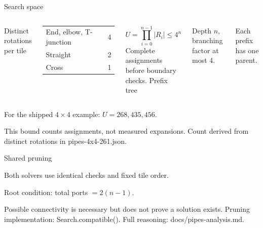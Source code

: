 \documentclass[aspectratio=169,11pt]{beamer}
\newcommand{\src}[1]{\vfill{\tiny\color{muted}#1}}
\begin{document}
\begin{frame}{Search space}
\begin{columns}[T,onlytextwidth]
\small Distinct rotations per tile\par\vspace{3mm}
\begin{tabular}{@{}lr@{}}\toprule
End, elbow, T-junction & 4\\
Straight & 2\\
Cross & 1\\\bottomrule
\end{tabular}
\vspace{4mm}
\normalsize
\[U=\prod_{i=0}^{n-1}|R_i|\leq 4^n\]
\small Complete assignments before boundary checks.
\small Prefix tree\par\vspace{3mm}
\par\small Depth $n$, branching factor at most 4.\par
Each prefix has one parent.
\end{columns}
\vspace{4mm}
For the shipped 4\,$\times$\,4 example: $U=268{,}435{,}456$.\par
\small This bound counts assignments, not measured expansions.
\src{Count derived from distinct rotations in pipes-4x4-261.json.}
\end{frame}

\begin{frame}{Shared pruning}
\centering
{}
\vspace{3mm}\par
\small Both solvers use identical checks and fixed tile order.\par
\vspace{2mm}
Root condition: total ports $=2(n-1)$.\par
Possible connectivity is necessary but does not prove a solution exists.
\src{Pruning implementation: Search.compatible(). Full reasoning: docs/pipes-analysis.md.}
\end{frame}
\end{document}
